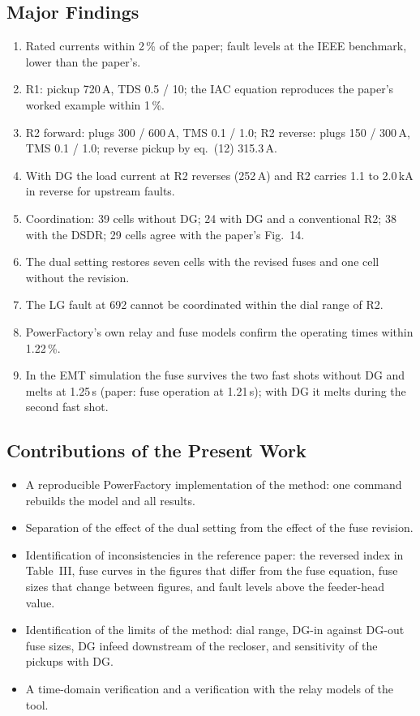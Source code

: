 \documentclass[12pt,letterpaper]{article}
\newcommand{\PF}{PowerFactory}
\begin{document}
\subsection{Major Findings}
\begin{enumerate}
\item Rated currents within 2\,\% of the paper; fault levels at the IEEE benchmark, lower than the paper's.
\item R1: pickup 720\,A, TDS 0.5 / 10; the IAC equation reproduces the paper's worked example within 1\,\%.
\item R2 forward: plugs 300 / 600\,A, TMS 0.1 / 1.0; R2 reverse: plugs 150 / 300\,A, TMS 0.1 / 1.0; reverse
      pickup by eq.~(12) 315.3\,A.
\item With DG the load current at R2 reverses (252\,A) and R2 carries 1.1 to 2.0\,kA in reverse for upstream
      faults.
\item Coordination: 39 cells without DG; 24 with DG and a conventional R2; 38 with the
      DSDR; 29 cells agree with the paper's Fig.~14.
\item The dual setting restores seven cells with the revised fuses and one cell without the revision.
\item The LG fault at 692 cannot be coordinated within the dial range of R2.
\item \PF's own relay and fuse models confirm the operating times within 1.22\,\%.
\item In the EMT simulation the fuse survives the two fast shots without DG and melts at 1.25\,s (paper:
      fuse operation at 1.21\,s); with DG it melts during the second fast shot.
\end{enumerate}

\subsection{Contributions of the Present Work}
\begin{itemize}
\item A reproducible \PF{} implementation of the method: one command rebuilds the model and all results.
\item Separation of the effect of the dual setting from the effect of the fuse revision.
\item Identification of inconsistencies in the reference paper: the reversed index in Table~III, fuse curves
      in the figures that differ from the fuse equation, fuse sizes that change between figures, and fault
      levels above the feeder-head value.
\item Identification of the limits of the method: dial range, DG-in against DG-out fuse sizes, DG infeed
      downstream of the recloser, and sensitivity of the pickups with DG.
\item A time-domain verification and a verification with the relay models of the tool.
\end{itemize}
\end{document}
